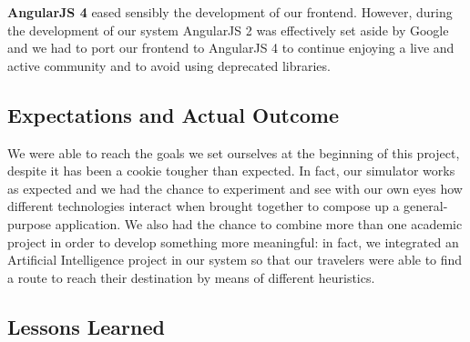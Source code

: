 \noindent\textbf{AngularJS 4} eased sensibly the development of our frontend.
However, during the development of our system AngularJS 2 was effectively set
aside by Google and we had to port our frontend to AngularJS 4 to continue
enjoying a live and active community and to avoid using deprecated libraries.

\subsection{Expectations and Actual Outcome}

We were able to reach the goals we set ourselves at the beginning of this
project, despite it has been a cookie tougher than expected.
In fact, our simulator works as expected and we had the chance to experiment
and see with our own eyes how different technologies interact when brought
together to compose up a general-purpose application.
We also had the chance to combine more than one academic project in order to
develop something more meaningful: in fact, we integrated an Artificial
Intelligence project in our system so that our travelers were able to find a
route to reach their destination by means of different heuristics.

\subsection{Lessons Learned}
